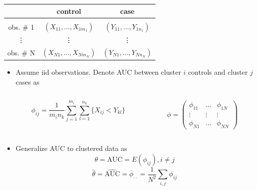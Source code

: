 \documentclass{beamer}
\newcommand{\E}{E}
\newcommand{\I}{N}
\newcommand{\auchat}{\overline{\phi}_{\cdot \cdot}}
\begin{document}
\begin{frame}
  \centering
  \begin{tabular}{c | c | c}
    & control & case\\
    \hline&&\\
    obs. \# 1 & $(X_{11},\ldots,X_{1m_1})$ & $(Y_{11},\ldots,Y_{1n_1})$\\
    \vdots & \vdots & \vdots\\
    obs. \# \I & $(X_{\I1},\ldots,X_{\I m_{\I}})$ & $(Y_{\I1},\ldots,Y_{\I n_{\I}})$\\
  \end{tabular}
  \begin{itemize}    
  \item Assume iid observations. Denote AUC between cluster $i$ controls and cluster $j$ cases as
    \begin{columns}
      \begin{column}{.5\textwidth}
        $$ \phi_{ij}=\frac{1}{m_in_k}\sum_{j=1}^{m_i}\sum_{l=1}^{n_k}\{X_{ij}<Y_{kl}\}$$
      \end{column}
      \begin{column}{.3\textwidth}
        $$\phi=
        \begin{pmatrix}
          \phi_{11} & \ldots &  \phi_{1\I}\\
          \vdots & \vdots & \vdots\\
          \phi_{\I1} & \ldots &  \phi_{\I\I}
        \end{pmatrix}$$
      \end{column}
    \end{columns}
  \item Generalize AUC to clustered data as
  $$\theta=\text{AUC}=\E(\phi_{ij}), i\neq j$$
  $$\hat\theta=\widehat{\text{AUC}}=\auchat=\frac{1}{\I^2}\sum_{i,j}\phi_{ij}$$
\end{itemize}
\end{frame}
\end{document}
